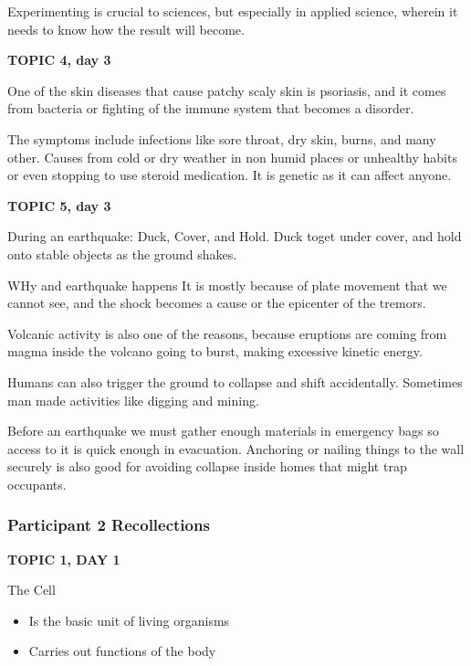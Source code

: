 {{Experimenting is crucial to sciences, but especially in applied science, wherein it needs to know how the result will become.

\textbf{TOPIC 4, day 3}




 One of the skin diseases  that cause patchy scaly skin is psoriasis, and it comes from bacteria or fighting of the immune system that becomes a disorder. 


The symptoms include infections like sore throat, dry skin, burns, and many other.
Causes from cold or dry weather in non humid places or unhealthy habits or even stopping to use steroid medication. It is genetic as it can affect anyone.

\textbf{TOPIC 5, day 3}










During an earthquake:
Duck, Cover, and Hold. Duck toget under cover, and hold onto stable objects as the ground shakes. 

WHy and earthquake happens
It is mostly because of plate movement that we cannot see, and the shock becomes a cause or the epicenter of the tremors. 

Volcanic activity is also one of the reasons, because eruptions are coming from magma inside the volcano going to burst, making excessive kinetic energy. 

Humans can also trigger the ground to collapse and shift accidentally. Sometimes man made activities like digging and mining.


Before an earthquake we must gather enough materials in emergency bags so access to it is quick enough in evacuation. Anchoring or nailing things to the wall securely is also good for avoiding collapse inside homes that might trap occupants.
}

\subsubsection{Participant 2 Recollections}

{\footnotesize
\textbf{TOPIC 1, DAY 1}


The Cell 
\begin{itemize}
    \item Is the basic unit of living organisms
    \item Carries out functions of the body
\end{itemize}


}}
